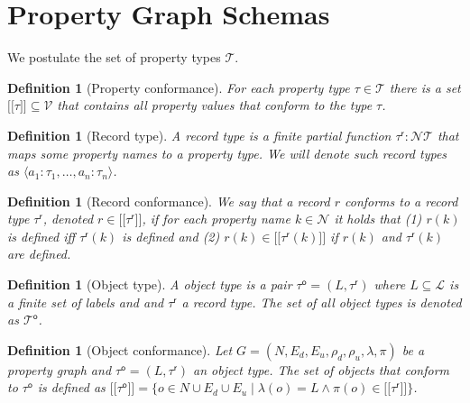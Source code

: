 \documentclass[a4paper]{article}
\makeatletter
\newtheorem{definition}[theorem]{Definition}
\newcommand{\pto}{}%
\DeclareRobustCommand{\pto}{\mathrel{\mathpalette\p@to@gets\to}}
\newcommand{\p@to@gets}[2]{%
  \ooalign{\hidewidth$\m@th#1\mapstochar\mkern5mu$\hidewidth\cr$\m@th#1\to$\cr}%
}
\newcommand{\ptype}{\tau}
\newcommand{\ptypes}{\mathcal{T}}
\newcommand{\rtype}{\tau^\mathsf{r}}
\newcommand{\otype}{\tau^\mathsf{o}}
\newcommand{\otypes}{\mathcal{T}^\mathsf{o}}
\newcommand{\lsem}{\ensuremath{[\![}}
\newcommand{\rsem}{\ensuremath{]\!]}}
\newcommand{\sem}[1]{\ensuremath{\lsem #1 \rsem}}
\makeatother
\begin{document}
\section{Property Graph Schemas}

We postulate the set of property types $\mathcal{T}$.

\begin{definition}[Property conformance]
  For each property type $\ptype \in \ptypes$ there is a set $\sem{\ptype} \subseteq \mathcal{V}$ that contains all property values that \emph{conform} to the type $\ptype$.
\end{definition}

\begin{definition}[Record type]
  A \emph{record type} is a finite partial function $\rtype : \mathcal{N} \pto \ptypes$ that maps some property names to a property type.
  We will denote such record types as $\langle a_1 : \ptype_1, \ldots, a_n : \ptype_n \rangle$.
\end{definition}

\begin{definition}[Record conformance]
  We say that a record $r$ \emph{conforms} to a record type $\rtype$, denoted $r \in \sem{\rtype}$, if for each property name $k \in \mathcal{N}$ it holds that (1) $r(k)$ is defined iff $\rtype(k)$ is defined and (2) $r(k) \in \sem{\rtype(k)}$ if $r(k)$ and $\rtype(k)$ are defined.
\end{definition}

\begin{definition}[Object type]
  A \emph{object type} is a pair $\otype = (L, \rtype)$ where $L \subseteq \mathcal{L}$ is a finite set of labels and and $\rtype$ a record type. 
  The set of all object types is denoted as $\otypes$.
\end{definition}

\begin{definition}[Object conformance]
  Let $G = (N, E_d, E_u, \rho_d, \rho_u, \lambda, \pi)$ be a property graph and $\otype = (L, \rtype)$ an object type. The set of objects that \emph{conform} to $\otype$ is defined as $\sem{\otype} = \{o \in N \cup E_d \cup E_u \mid \lambda(o) = L \wedge \pi(o) \in \sem{\rtype}\}$.
\end{definition}
\end{document}
